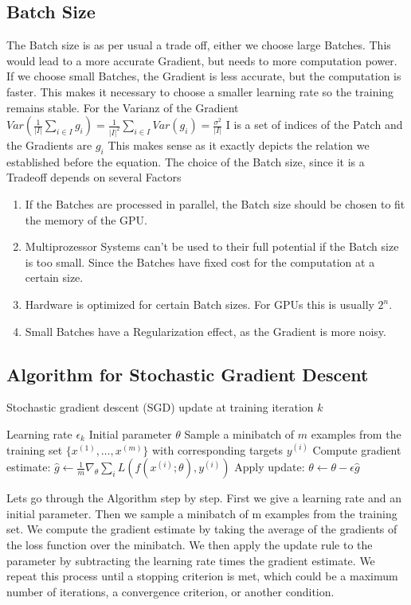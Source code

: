 \documentclass[a4paper]{article}
\begin{document}
\subsection{Batch Size}
The Batch size is as per usual a trade off, either we choose large Batches. This would lead to a more accurate Gradient, but needs to more computation power. If we choose small Batches, the Gradient is less accurate, but the computation is faster. This makes it necessary to choose a smaller learning rate so the training remains stable.
For the Varianz of the Gradient $Var(\frac{1}{|I|} \sum_{i\in I} g_{i}) = \frac{1}{|I|^{2}}\sum_{i\in I}Var(g_{i})= \frac{\sigma^{2}}{|I|}$
I is a set of indices of the Patch and the Gradients are $g_{i}$ This makes sense as it exactly depicts the relation we established before the equation.
The choice of the Batch size, since it is a Tradeoff depends on several Factors
\begin{enumerate}
    \item If the Batches are processed in parallel, the Batch size should be chosen to fit the memory of the GPU.
    \item Multiprozessor Systems can't be used to their full potential if the Batch size is too small. Since the Batches have fixed cost for the computation at a certain size. 
    \item Hardware is optimized for certain Batch sizes. For GPUs this is usually $2^{n}$.
    \item Small Batches have a Regularization effect, as the Gradient is more noisy.
\end{enumerate}

\subsection{Algorithm for Stochastic Gradient Descent}
\begin{algorithm}[h]
    \caption{Stochastic gradient descent (SGD) update at training iteration $k$}
    \begin{algorithmic}
    \Require Learning rate $\epsilon_k$
    \Require Initial parameter $\theta$
        \State Sample a minibatch of $m$ examples from the training set $\{ x^{(1)}, \ldots, x^{(m)} \}$ with corresponding targets $y^{(i)}$
        \State Compute gradient estimate: $\hat{g} \leftarrow \frac{1}{m} \nabla_\theta \sum_{i} L(f(x^{(i)}; \theta), y^{(i)})$
        \State Apply update: $\theta \leftarrow \theta - \epsilon \hat{g}$
    \EndWhile
    \end{algorithmic}
    \end{algorithm}
    Lets go through the Algorithm step by step. First we give a learning rate and an initial parameter. Then we sample a minibatch of m examples from the training set. We compute the gradient estimate by taking the average of the gradients of the loss function over the minibatch. We then apply the update rule to the parameter by subtracting the learning rate times the gradient estimate. We repeat this process until a stopping criterion is met, which could be a maximum number of iterations, a convergence criterion, or another condition.
\end{document}
